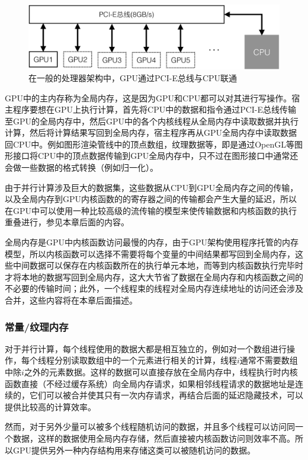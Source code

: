\begin{figure}
\sidecaption
	\includegraphics[width=.65\textwidth]{figures/rp/pci-e}
	\caption{在一般的处理器架构中，GPU通过PCI-E总线与CPU联通}
	\label{f:rp-pci-e}
\end{figure}

GPU中的主内存称为全局内存，这是因为GPU和CPU都可以对其进行写操作。宿主程序要想在GPU上执行计算，首先将CPU中的数据和指令通过PCI-E总线传输至GPU的全局内存中，然后GPU中的各个内核线程从全局内存中读取数据并执行计算，然后将计算结果写回到全局内存，宿主程序再从GPU全局内存中读取数据回CPU中。例如图形渲染管线中的顶点数组，纹理数据等，即是通过OpenGL等图形接口将CPU中的顶点数据传输到GPU全局内存中，只不过在图形接口中通常还会做一些数据的格式转换（例如归一化）。

由于并行计算涉及巨大的数据集，这些数据从CPU到GPU全局内存之间的传输，以及全局内存到GPU内核函数的的寄存器之间的传输都会产生大量的延迟，所以在GPU中可以使用一种比较高级的流传输的模型来使传输数据和内核函数的执行重叠进行，参见本章后面的内容。

全局内存是GPU中内核函数访问最慢的内存，由于GPU架构使用程序托管的内存模型，所以内核函数可以选择不需要将每个变量的中间结果都写回到全局内存，这些中间数据可以保存在内核函数所在的执行单元本地，而等到内核函数执行完毕时才将本地的数据写回到全局内存，这大大节省了数据在全局内存和内核函数之间的不必要的传输时间；此外，一个线程束的线程对全局内存连续地址的访问还会涉及合并，这些内容将在本章后面描述。





\subsubsection{常量/纹理内存}
对于并行计算，每个线程使用的数据大都是相互独立的，例如对一个数组进行操作，每个线程分别读取数组中的一个元素进行相关的计算，线程$i$通常不需要数组中除$i$之外的元素数据。这样的数据可以直接存放在全局内存中，线程执行时内核函数直接（不经过缓存系统）向全局内存请求，如果相邻线程请求的数据地址是连续的，它们可以被合并使其只有一次内存请求，再结合后面的延迟隐藏技术，可以提供比较高的计算效率。

然而，对于另外少量可以被多个线程随机访问的数据，并且多个线程可以访问同一个数据，这样的数据使用全局内存存储，然后直接被内核函数访问则效率不高。所以GPU提供另外一种内存结构用来存储这类可以被随机访问的数据。

